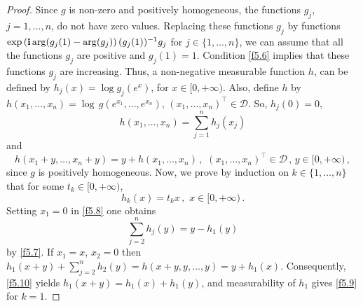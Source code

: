 \documentclass{amsart}
\begin{document}
\begin{proof}
Since $g$ is non-zero and positively homogeneous, the functions $g_j$, $ j=1,\ldots,n$,  do not have zero values. Replacing these functions $g_j$ by functions
\linebreak[4]
 ${\rm exp} \left( {\mathbf i} \, {\rm arg}(g_j(1)-{\rm arg}(g_j) \right) (g_j(1))^{-1} g_j$ for $j \in \{1,\ldots,n\}$, we can assume that all the functions $g_j$ are positive and $g_j(1)=1$. Condition \eqref{f5.6} implies that these functions $g_j$ are increasing. Thus, a non-negative measurable function $h$, can be defined by $h_j(x)=\log g_j(e^x)$, for $x \in [0,+\infty)$. Also, define $h$ by $h(x_1,\ldots,x_n)= \log \, g(e^{x_1},\ldots,e^{x_n})$, $(x_1,\ldots,x_n)^\top \in \mathcal D$. So, $h_j(0)=0$,
\begin{equation} \label{f5.7}
      h(x_1,\ldots,x_n)=\sum_{j=1}^n h_j(x_j) 
\end{equation}
and 
\begin{equation}   \label{f5.8}
     h(x_1+y,\ldots,x_n+y) = y + h(x_1,\ldots,x_n) \, , \,\, (x_1,\ldots,x_n)^\top \in {\mathcal D} \, ,\, y \in [0,+\infty) \, ,
\end{equation}           
since $g$ is positively homogeneous. Now, we prove by induction on $k \in \{1,\ldots,n\}$  that for some $t_k \in [0,+\infty)$,
\begin{equation} \label{f5.9}
     h_k(x)=t_k x \, , \,\, x \in[0,+\infty) \, .
\end{equation}
Setting $x_1=0$ in \eqref{f5.8} one obtains
\begin{equation} \label{f5.10}
     \sum_{j=2}^n h_j(y) = y - h_1(y)
\end{equation}
by \eqref{f5.7}. If $x_1=x$, $x_2=0$ then $h_1(x+y) + \sum_{j=2}^n h_2(y) = h(x+y,y,\ldots,y) = y+h_1(x)$. Consequently, \eqref{f5.10} yields $h_1(x+y)=h_1(x)+h_1(y)$, and measurability of $h_1$ gives \eqref{f5.9} for $k=1$. 


\end{proof}
\end{document}
